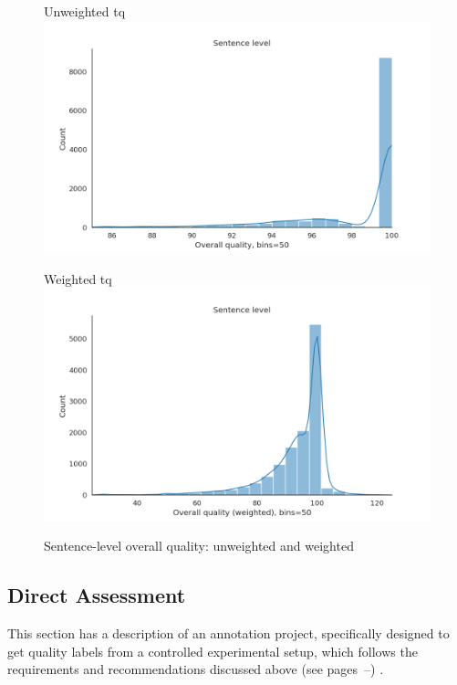 \begin{figure}[H]
	\begin{minipage}[c]{0.5\linewidth}	
		\centering
		Unweighted tq
		\includegraphics[width=\textwidth]{figures/err/sent-tq-noweights}	
	\end{minipage}
	\begin{minipage}[c]{0.5\linewidth}
		\centering
		Weighted tq
		\includegraphics[width=\textwidth]{figures/err/sent-tq-major2critical5weighted}
	\end{minipage}
	\caption{\label{fig:sents_tq}Sentence-level overall quality: unweighted and weighted}
\end{figure}


\subsection{\label{ssec:da}Direct Assessment}
This section has a description of an annotation project, specifically designed to get quality labels from a controlled experimental setup, which follows the requirements and recommendations discussed above (see pages~\pageref{par:da_best}--\pageref{ssec:relval}) .
 
